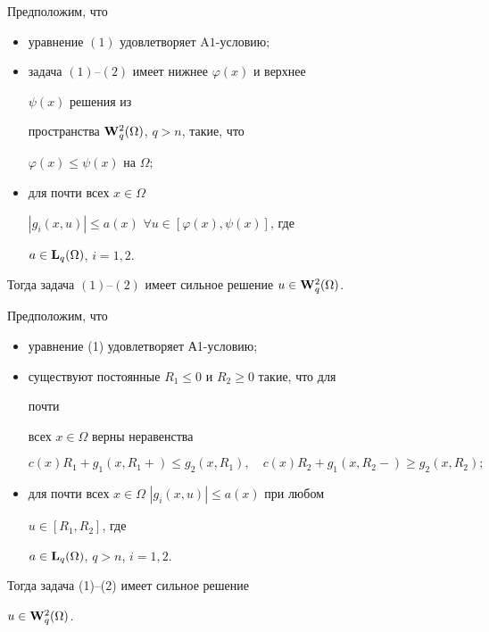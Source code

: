  


\begin{thm} Предположим, что 


\begin{itemize} 


\item[1)] уравнение $(1)$ удовлетворяет $\mathrm{A1}$-условию$;$ 


\item[2)] задача $(1)$--$(2)$ имеет нижнее $\varphi(x)$ и верхнее 


$\psi(x)$ решения из 


пространства $\bold W^2_q(\Omega)$, $q>n$, такие, что 


$\varphi(x)\le\psi(x)$ на $\Omega;$ 


\item[3)] для почти всех $x\in\Omega$\; 


$|g_i(x,u)|\le a(x)$\; $\forall u\in[\varphi(x),\psi(x)]$, где 


$a\in\bold L_q(\Omega)$, $i=1,2$. 


\end{itemize} 


Тогда задача $(1)$--$(2)$ имеет сильное решение $u\in\bold 


W^2_q(\Omega)$. 


\end{thm} 


 


\begin{cornonum} Предположим, что 


\begin{itemize} 


\item[1)] уравнение (1) удовлетворяет А1-условию; 


\item[2)] существуют постоянные $R_1\le 0$ и $R_2\ge 0$ такие, что для 


почти 


всех $x\in\Omega$ верны неравенства 


$$ 


c(x)R_1+g_1(x,R_1+)\le g_2(x,R_1),\quad 


c(x)R_2+g_1(x,R_2-)\ge g_2(x,R_2); 


$$ 


\item[3)] для почти всех $x\in\Omega$\; $|g_i(x,u)|\le a(x)$ при любом 


$u\in[R_1,R_2]$, где 


$a\in\bold L_q(\Omega)$, $q>n$, $i=1,2$. 


\end{itemize} 


Тогда задача (1)--(2) имеет сильное решение 


$u\in\bold W^2_q(\Omega)$. 


\end{cornonum} 


